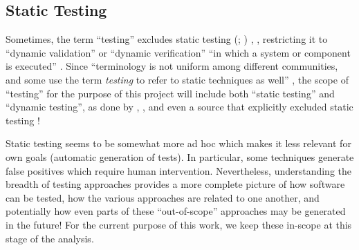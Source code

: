     \subsection{Static Testing}
    \label{static-test}
    Sometimes, the term ``testing'' excludes static testing
    \ifnotpaper
        (\citealp[p.~222]{AmmannAndOffutt2017}; \citealp[p.~13]{Firesmith2015})%
    \else
        \cite[p.~222]{AmmannAndOffutt2017}, \cite[p.~13]{Firesmith2015}%
    \fi, restricting it to ``dynamic validation'' \citep[p.~5-1]{SWEBOK2024} or
    ``dynamic verification'' ``in which a system or component is
    executed'' \citep[p.~427]{IEEE2017}. Since ``terminology is not uniform
    among different communities, and some use the term \emph{testing} to refer to
    static techniques as well''
    \citep[p.~5-2]{SWEBOK2024}, the scope of ``testing'' for the purpose of this
    project will include both ``static testing'' and ``dynamic testing'', as
    done by \citet[p.~17]{IEEE2022}, \citet[pp.~8-9]{Gerrard2000a}, and even a
    source that explicitly excluded static testing \citep[p.~440]{IEEE2017}!

    Static testing seems to be somewhat more ad hoc which makes it
    less relevant for own goals (automatic generation of tests). In particular,
    some techniques generate false positives which require human intervention.
    Nevertheless, understanding the breadth of testing approaches provides a more
    complete picture of how software can be tested, how the various approaches are
    related to one another, and potentially how even parts of these ``out-of-scope''
    approaches may be generated in the future! For the current purpose of this
    work, we keep these in-scope at this stage of the analysis.
\fi